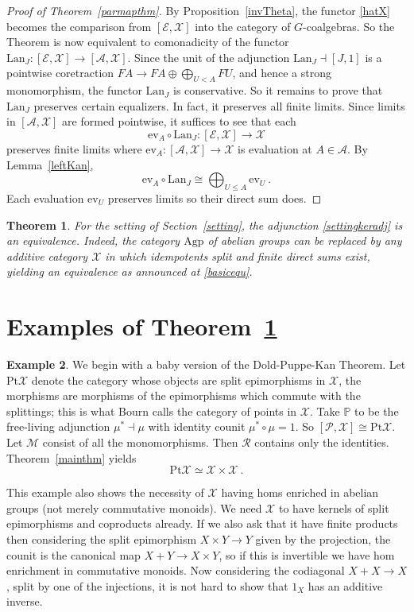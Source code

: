 \documentclass[a4paper,12pt,reqno]{amsart}
\newtheorem{theorem}{Theorem}[section] %
\theoremstyle{definition}
\newtheorem{example}[theorem]{Example}
\theoremstyle{fact}
\theoremstyle{genquest}
\theoremstyle{step}
\newcommand{\dd}{\colon}
\newcommand{\lra}{\longrightarrow}
\newcommand{\ra}{\rightarrow}
\def\CA{{\mathscr A}}
\def\CE{{\mathscr E}}
\def\CM{{\mathscr M}}
\def\CP{{\mathscr P}}
\def\CR{{\mathscr R}}
\def\CX{{\mathscr X}}
\begin{document}
\begin{proof}[Proof of Theorem~\ref{parmapthm}]
By Proposition~\ref{invTheta}, the functor \eqref{hatX} becomes the
comparison from $[\CE,\CX]$ into the category of $G$-coalgebras. 
So the Theorem is now equivalent to comonadicity of the functor 
$\mathrm{Lan}_J \dd [\CE,\CX]\ra [\CA,\CX]$.
Since the unit of the adjunction $\mathrm{Lan}_J \dashv [J,1]$ is a
pointwise coretraction $FA \lra FA\oplus \bigoplus_{U< A}{FU}$, 
and hence a strong monomorphism, 
the functor $\mathrm{Lan}_J$ is conservative. 
So it remains to prove that $\mathrm{Lan}_J$ preserves certain equalizers.
In fact, it preserves all finite limits. Since limits in $[\CA,\CX]$ are formed
pointwise, it suffices to see that each 
$$\mathrm{ev}_A\circ \mathrm{Lan}_J \dd [\CE,\CX]\lra \CX$$
preserves finite limits where $\mathrm{ev}_A \dd [\CA,\CX]\ra \CX$ is evaluation
at $A\in \CA$. By Lemma~\ref{leftKan}, 
$$\mathrm{ev}_A\circ \mathrm{Lan}_J \cong \bigoplus_{U\le A}\mathrm{ev}_U \ .$$
Each evaluation $\mathrm{ev}_U$ preserves limits so their direct sum does.    
\end{proof}

\begin{theorem}\label{settingmainthm}
For the setting of Section~\ref{setting}, the adjunction \eqref{settingkeradj} is an equivalence.
Indeed, the category $\mathrm{Agp}$ of abelian groups can be replaced by any
additive category $\CX$ in which idempotents split and finite direct sums exist,
yielding an equivalence as announced at \eqref{basicequ}. 
\end{theorem}

\section{Examples of Theorem~\ref{settingmainthm}}\label{exx}

\begin{example}\label{babyDPK} 
We begin with a baby version of the Dold-Puppe-Kan Theorem.
Let $\mathrm{Pt}\CX$ denote the category whose objects are split epimorphisms in $\CX$, the morphisms are morphisms of the epimorphisms
which commute with the splittings; this is what Bourn \cite{Bourn91} calls the category of points in $\CX$.  
Take $\mathbb{P}$ to be the free-living adjunction $\mu^*\dashv \mu$ with identity counit $\mu^*\circ \mu = 1$.
So $[\CP,\CX] \cong \mathrm{Pt}\CX$.  
Let $\CM$ consist of all the monomorphisms. 
Then $\CR$ contains only the identities. 
Theorem~\ref{mainthm} yields $$\mathrm{Pt}\CX \simeq \CX \times \CX \ .$$

This example also shows the necessity of $\CX$ having homs enriched in abelian groups (not merely commutative monoids). 
We need $\CX$ to have kernels of split epimorphisms and coproducts already. 
If we also ask that it have finite products then considering the split epimorphism $X\times Y\ra Y$ given by the projection, the counit 
is the canonical map $X+Y \ra X\times Y$, 
so if this is invertible we have hom enrichment in commutative monoids. 
Now considering the codiagonal $X+ X\ra X$, split by one of the 
injections, it is not hard to show that $1_X$ has an additive inverse. 
\end{example}
\end{document}

